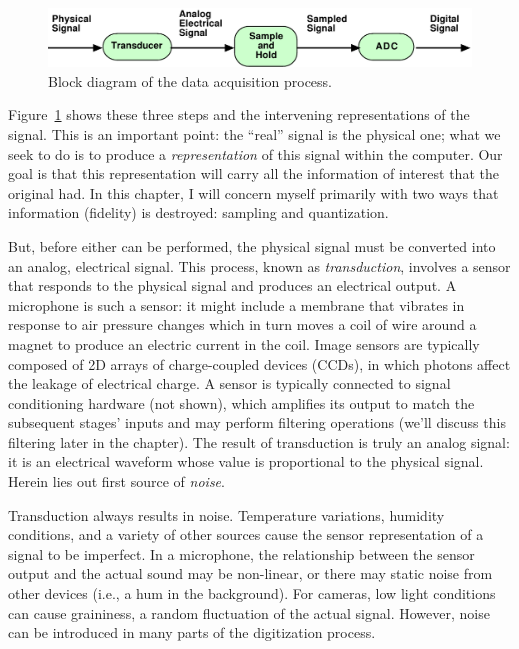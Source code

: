 \begin{figure}
\centerline{\includegraphics[width=\textwidth]{ch-computer/adc}}
\caption{Block diagram of the data acquisition process.\label{fg:adc}}
\end{figure}

Figure~\ref{fg:adc} shows these three steps and the intervening
representations of the signal.  This is an important point: the
``real'' signal is the physical one; what we seek to do is to produce
a \emph{representation} of this signal within the computer. Our goal
is that this representation will carry all the information of interest
that the original had. In this chapter, I will concern myself primarily
with two ways that information (fidelity) is destroyed: sampling and
quantization.

But, before either can be performed, the physical signal must be
converted into an analog, electrical signal. This process, known as
\emph{transduction}, involves a sensor that responds to the physical
signal and produces an electrical output. A
microphone is such a sensor: it might include a membrane that vibrates
in response to air pressure changes which in turn moves a coil of wire
around a magnet to produce an electric current in the coil. Image
sensors are typically composed of 2D arrays of charge-coupled devices
(CCDs), in which photons affect the leakage of electrical charge. A
sensor is typically connected to signal conditioning hardware (not
shown), which amplifies its output to match the subsequent stages'
inputs and may perform filtering operations (we'll discuss this
filtering later in the chapter).  The result of transduction is truly
an analog signal: it is an electrical waveform whose value is
proportional to the physical signal. Herein lies out first source of \emph{noise}.

Transduction always results in noise. Temperature variations, humidity conditions, and a variety of other sources cause the sensor representation of a signal to be imperfect. In a microphone, the relationship between the sensor output and the actual sound may be non-linear, or there may static noise from other devices (i.e., a hum in the background). For cameras, low light conditions can cause graininess, a random fluctuation of the actual signal. However, noise can be introduced in many parts of the digitization process.

